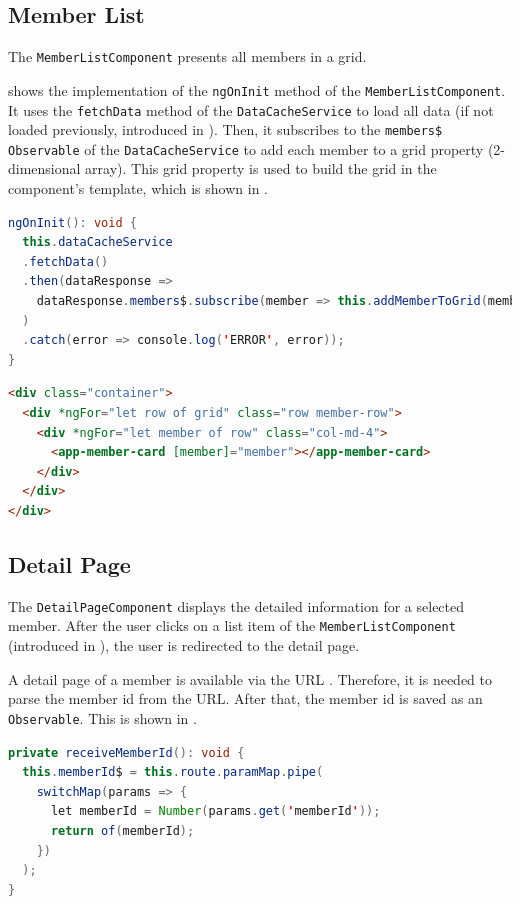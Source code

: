 \newpage
\subsection{Member List}\label{subsec:02_impl_memberlist}
The \texttt{MemberListComponent} presents all members in a grid.


 shows the implementation of the \texttt{ngOnInit} method of the \newline \texttt{MemberListComponent}. It uses the \texttt{fetchData} method of the \texttt{DataCacheService} to load all data (if not loaded previously, introduced in ). Then, it subscribes to the \texttt{members\$} \texttt{Observable} of the \texttt{DataCacheService} to add each member to a grid property (2-dimensional array).
This grid property is used to build the grid in the component's template, which is shown in .

\begin{lstlisting}[label=lst:02_impl_memberlist_ngoninit, caption=\texttt{MemberListComponent} \texttt{ngOnInit} implementation, language=java]
ngOnInit(): void {
  this.dataCacheService
  .fetchData()
  .then(dataResponse =>
    dataResponse.members$.subscribe(member => this.addMemberToGrid(member))
  )
  .catch(error => console.log('ERROR', error));
}
\end{lstlisting}


\begin{lstlisting}[label=lst:02_impl_memberlist_template, caption=Template of \texttt{MemberListComponent}, language=HTML]
<div class="container">
  <div *ngFor="let row of grid" class="row member-row">
    <div *ngFor="let member of row" class="col-md-4">
      <app-member-card [member]="member"></app-member-card>
    </div>
  </div>
</div>
\end{lstlisting}


\newpage
\subsection{Detail Page}\label{subsec:02_impl_detail}
The \texttt{DetailPageComponent} displays the detailed information for a selected member.
After the user clicks on a list item of the \texttt{MemberListComponent} (introduced in ), the user is redirected to the detail page.


A detail page of a member is available via the URL . Therefore, it is needed to parse the member id from the URL. After that, the member id is saved as an \texttt{Observable}. This is shown in .
\begin{lstlisting}[label=lst:02_impl_detail_receiveMemberId, caption=Implementation of \texttt{receiveMemberId}, language=java]
private receiveMemberId(): void {
  this.memberId$ = this.route.paramMap.pipe(
    switchMap(params => {
      let memberId = Number(params.get('memberId'));
      return of(memberId);
    })
  );
}
\end{lstlisting}

